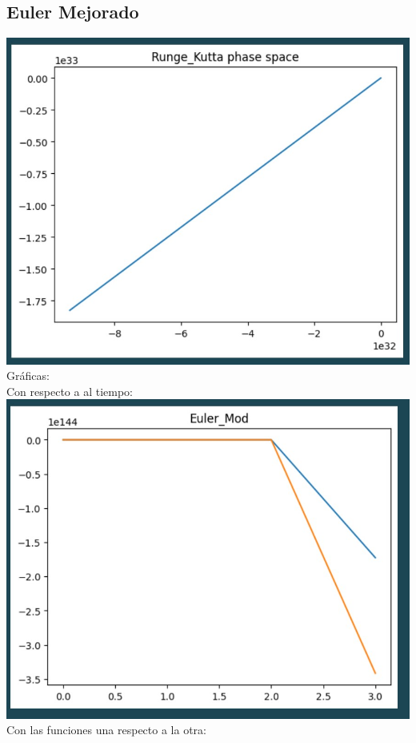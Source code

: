 \documentclass{article}
\begin{document}
          \subsection*{Euler Mejorado}
             \includegraphics{x_y_values_euler.jpg}
             \\Gráficas:\\  
             Con respecto a al tiempo:
              \includegraphics{eulermod.jpg}
             Con las funciones una respecto a la otra:
\end{document}
